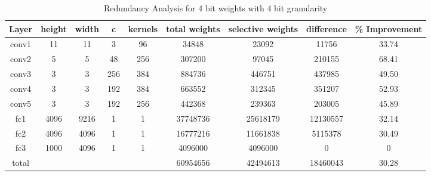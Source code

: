 \documentclass[conference]{IEEEtran}
\begin{document}
\color{black}

\begin{table}[!hbt]
\centering
\caption{Redundancy Analysis for 4 bit weights with 4 bit granularity}
\label{Red_Anal}
\begin{tabular}{ccccccccc}
\hline
Layer & height    & width    & c   & kernels & total weights & selective weights  & difference & \% Improvement \\ \hline
conv1 & 11   & 11   & 3   & 96      & 34848         & 23092             & 11756      & 33.74          \\
conv2 & 5    & 5    & 48  & 256     & 307200        & 97045             & 210155     & 68.41          \\
conv3 & 3    & 3    & 256 & 384     & 884736        & 446751            & 437985     & 49.50          \\
conv4 & 3    & 3    & 192 & 384     & 663552        & 312345             & 351207     & 52.93          \\
conv5 & 3    & 3    & 192 & 256     & 442368        & 239363             & 203005     & 45.89          \\
fc1   & 4096 & 9216 & 1   & 1       & 37748736      & 25618179         & 12130557   & 32.14          \\
fc2   & 4096 & 4096 & 1   & 1       & 16777216      & 11661838          & 5115378    & 30.49          \\
fc3   & 1000 & 4096 & 1   & 1       & 4096000       & 4096000           & 0          & 0              \\ \hline
total &      &      &     &         & 60954656      & 42494613          & 18460043   & 30.28          \\ \hline
\end{tabular}
\end{table}
\end{document}
